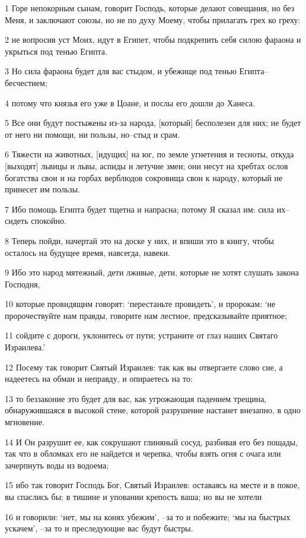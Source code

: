 \par 1 Горе непокорным сынам, говорит Господь, которые делают совещания, но без Меня, и заключают союзы, но не по духу Моему, чтобы прилагать грех ко греху:
\par 2 не вопросив уст Моих, идут в Египет, чтобы подкрепить себя силою фараона и укрыться под тенью Египта.
\par 3 Но сила фараона будет для вас стыдом, и убежище под тенью Египта--бесчестием;
\par 4 потому что князья его уже в Цоане, и послы его дошли до Ханеса.
\par 5 Все они будут постыжены из-за народа, [который] бесполезен для них; не будет от него ни помощи, ни пользы, но--стыд и срам.
\par 6 Тяжести на животных, [идущих] на юг, по земле угнетения и тесноты, откуда [выходят] львицы и львы, аспиды и летучие змеи; они несут на хребтах ослов богатства свои и на горбах верблюдов сокровища свои к народу, который не принесет им пользы.
\par 7 Ибо помощь Египта будет тщетна и напрасна; потому Я сказал им: сила их--сидеть спокойно.
\par 8 Теперь пойди, начертай это на доске у них, и впиши это в книгу, чтобы осталось на будущее время, навсегда, навеки.
\par 9 Ибо это народ мятежный, дети лживые, дети, которые не хотят слушать закона Господня,
\par 10 которые провидящим говорят: `перестаньте провидеть', и пророкам: `не пророчествуйте нам правды, говорите нам лестное, предсказывайте приятное;
\par 11 сойдите с дороги, уклонитесь от пути; устраните от глаз наших Святаго Израилева.'
\par 12 Посему так говорит Святый Израилев: так как вы отвергаете слово сие, а надеетесь на обман и неправду, и опираетесь на то:
\par 13 то беззаконие это будет для вас, как угрожающая падением трещина, обнаружившаяся в высокой стене, которой разрушение настанет внезапно, в одно мгновение.
\par 14 И Он разрушит ее, как сокрушают глиняный сосуд, разбивая его без пощады, так что в обломках его не найдется и черепка, чтобы взять огня с очага или зачерпнуть воды из водоема;
\par 15 ибо так говорит Господь Бог, Святый Израилев: оставаясь на месте и в покое, вы спаслись бы; в тишине и уповании крепость ваша; но вы не хотели
\par 16 и говорили: `нет, мы на конях убежим', --за то и побежите; `мы на быстрых ускачем', --за то и преследующие вас будут быстры.
